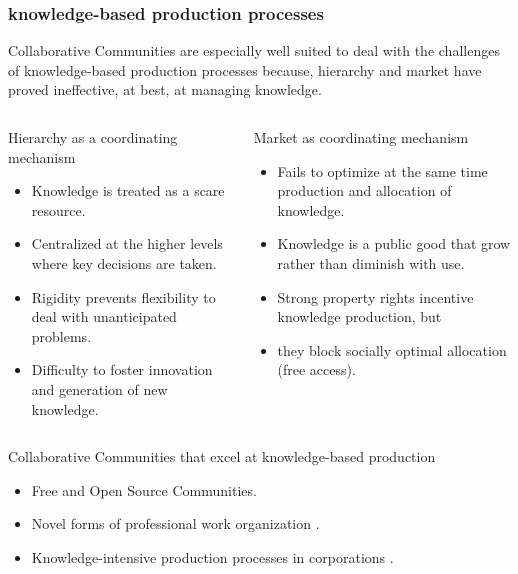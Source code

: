 \documentclass[ignorenonframetext,red,8pt,notes=hide]{beamer}
\begin{document}
\begin{frame}
\frametitle{knowledge-based production processes}
Collaborative Communities are especially well suited to deal with the challenges of knowledge-based production processes because, hierarchy and market have proved ineffective, at best, at managing knowledge.  

\begin{columns}[c]

\begin{column}{0.5\textwidth}
\begin{block}{Hierarchy as a coordinating mechanism}
\begin{itemize}
\item Knowledge is treated as a scare resource.
\item Centralized at the higher levels where key decisions are taken.
\item Rigidity prevents flexibility to deal with unanticipated problems.
\item Difficulty to foster innovation and generation of new knowledge.
\end{itemize}
\end{block}
\end{column}

\pause

\begin{column}{0.5\textwidth}
\begin{block}{Market as coordinating mechanism}
\begin{itemize}
\item Fails to optimize at the same time production and allocation of knowledge.
\item Knowledge is a public good that grow rather than diminish with use.
\item Strong property rights incentive knowledge production, but
\item they block socially optimal allocation (free access).
\end{itemize}
\end{block}
\end{column}

\end{columns}

\pause

\begin{block}{Collaborative Communities that excel at knowledge-based production}
\begin{itemize}
\item Free and Open Source Communities.
\item Novel forms of professional work organization \citep*{adler:2008}.
\item Knowledge-intensive production processes in corporations \citep{adler:2006}.
\end{itemize}
\end{block}

\end{frame}
\end{document}
